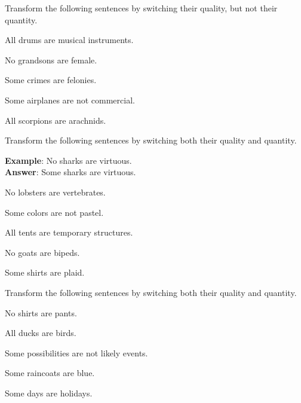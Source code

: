 \noindent\problempart Transform the following sentences by switching their quality, but not their quantity.

\begin{exercises}
\item All drums are musical instruments.
\item No grandsons are female.
\item Some crimes are felonies.
\item Some airplanes are not commercial.
\item All scorpions are arachnids.
\end{exercises}

\noindent\problempart Transform the following sentences by switching both their quality and quantity.

\textbf{Example}: No sharks are virtuous. \\
\textbf{Answer}: Some sharks are virtuous.

\begin{exercises}
\item No lobsters are vertebrates. 

\item Some colors are not pastel. 

\item All tents are temporary structures.

\item No goats are bipeds. 

\item Some shirts are plaid.
\end{exercises}

\noindent\problempart Transform the following sentences by switching both their quality and quantity.

\begin{exercises}
\item No shirts are pants.
\item All ducks are birds.
\item Some possibilities are not likely events.
\item Some raincoats are blue.
\item Some days are holidays.
\end{exercises}


